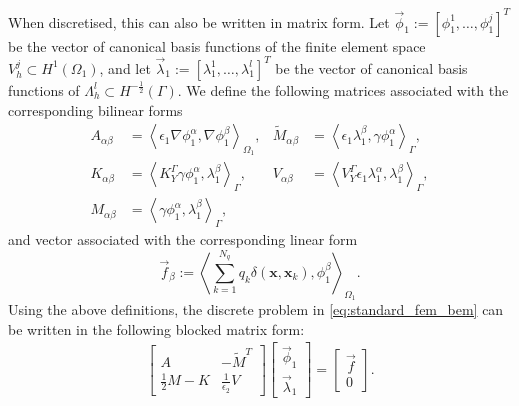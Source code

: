 When discretised, this can also be written in matrix form. Let $\vec{\phi}_1 := [\phi_1^1, \dots, \phi_1^j]^T$ be the vector of canonical basis
functions of the finite element space $V_{h}^{j}\subset H^1(\Omega_1)$, %
and let $\vec{\lambda}_1 := [\lambda_1^1, \dots, \lambda_1^l]^T$ be the vector of canonical basis
functions of $\Lambda_{h}^{l}\subset H^{-\frac{1}{2}}(\Gamma)$. %
We define the following matrices associated with the corresponding bilinear forms
\begin{align*}
A_{\alpha \beta} &= \left\langle\epsilon_1\nabla\phi_1^{\alpha}, \nabla \phi_1^{\beta} \right\rangle_{\Omega_1},&
\widetilde{M}_{\alpha \beta} &= \left\langle \epsilon_1\lambda^{\beta}_1, \gamma \phi_1^{\alpha}\right\rangle_{\Gamma},\\
K_{\alpha \beta} &= \left\langle K_{Y}^{\Gamma} \gamma \phi^{\alpha}_1, \lambda^{\beta}_1 \right\rangle_{\Gamma},&
V_{\alpha \beta} &= \left\langle V_{Y}^{\Gamma} \epsilon_1\lambda^{\alpha}_1, \lambda^{\beta}_1 \right\rangle_{\Gamma},\\
M_{\alpha \beta} &= \left\langle \gamma \phi^{\alpha}_1, \lambda^{\beta}_1 \right\rangle_{\Gamma},
\end{align*}
and vector associated with the corresponding linear form
\begin{equation*}
\vec{f}_{\beta} := \left\langle  \sum_{k=1}^{N_q} q_k\delta(\mathbf{x},\mathbf{x}_k),  \phi_1^{\beta} \right\rangle_{\Omega_1}.
\end{equation*}
Using the above definitions, the discrete problem in \eqref{eq:standard_fem_bem} can be written in the following blocked matrix form:
\begin{align}\label{eq:fembem_matrix}
\begin{bmatrix}
A & -\widetilde{M}^T \\  
\tfrac12 M - K &  \tfrac{1}{\epsilon_2} V 
\end{bmatrix}
\begin{bmatrix}
\vec{\phi}_1 \\  
\vec{\lambda}_1
\end{bmatrix}
= 
\begin{bmatrix}
\vec{f} \\  
0
\end{bmatrix}.
\end{align}


